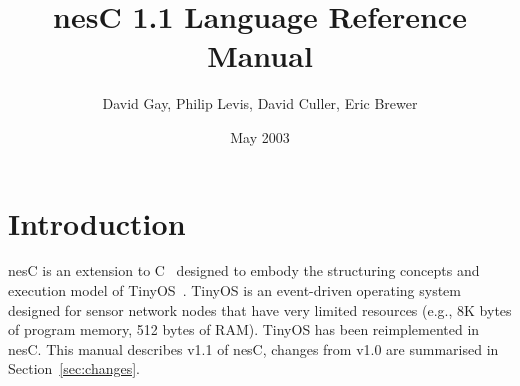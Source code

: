 \documentclass[11pt,letterpaper]{article}
\newcommand{\nesc}{nesC\xspace}
\newcommand{\tinyos}{TinyOS\xspace}
\begin{document}
\title{\nesc 1.1 Language Reference Manual}
\author{David Gay, Philip Levis, David Culler, Eric Brewer}
\date{May 2003}

\maketitle

\section{Introduction}

\nesc is an extension to C~\cite{kandr} designed to embody the structuring
concepts and execution model of \tinyos~\cite{tinyos}. \tinyos is an
event-driven operating system designed for sensor network nodes that have
very limited resources (e.g., 8K bytes of program memory, 512 bytes of
RAM). \tinyos has been reimplemented in \nesc. This manual describes v1.1 of
\nesc, changes from v1.0 are summarised in Section~\ref{sec:changes}.
\end{document}
